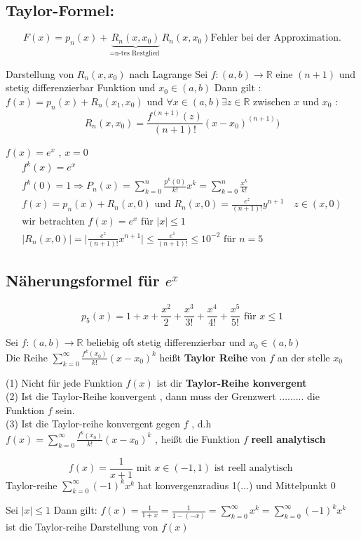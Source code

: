 \subsection{Taylor-Formel:}
\[ F(x) = p_n(x)+ \underbrace{R_n(x,x_0)}_{=  \text{n-tes Restglied }} R_n(x,x_0) \text{Fehler bei der Approximation.} \]
\begin{theorem}
Darstellung von $R_n(x,x_0)$ nach Lagrange 
Sei $f:(a,b) \rightarrow \mathbb{R}$ eine $(n+1)$ und stetig differenzierbar Funktion und $x_0 \in (a,b)$
Dann gilt : $f(x)= p_n(x)+ R_n(x_1 , x_0)$ und $\forall x \in (a,b) \exists z \in \mathbb{R}$ zwischen $x$ und $x_0$ : \\
   \[ R_n(x , x_0) = \frac{f^{(n+1)}(z)}{(n+1)!}(x-x_0)^{(n+1)}) \]
\end{theorem}
\begin{example}
$f(x)=e^x$ , $x = 0$
\begin{gather*}
f^k(x)= e^x\\
f^k(0)= 1 \Rightarrow P_n(x) = \sum_{k=0}^{n}{\frac{p^k(0)}{k!}x^k} = \sum_{k=0}^{n}{\frac{x^k}{k!}}\\
f(x)= p_n(x) + R_n(x,0) \text{ und } R_n(x,0) = \frac{e^z}{(n+1)!} y^{n+1} \quad z \in (x,0)\\
\text{wir betrachten } f(x) = e^x \text{ für } |x| \leq 1\\
\big|R_n(x,0)|=|\frac{e^z}{(n+1)!}x^{n+1}| \leq \frac{e^1}{(n+1)!} \leq 10^{-2} \text{ für } n = 5
\end{gather*}
\subsection{Näherungsformel für $e^x$}
\[ p_5 (x) = 1 + x + \frac{x^2}{2} + \frac{x^3}{3!} + \frac{x^4}{4!} + \frac{x^5}{5!} \text{ für } x \leq 1 \]
\end{example}
\begin{definition}
Sei $f : (a,b) \rightarrow \mathbb{R}$ beliebig oft stetig differenzierbar und $x_0 \in (a,b)$\\
Die Reihe $\sum_{k=0}^{\infty}{\frac{f^k(x_0)}{k!}(x-x_0)^k}$ heißt \textbf{Taylor Reihe} von $f$ an der stelle $x_0$ 
\end{definition}
\begin{remark}
(1) Nicht für jede Funktion $f(x)$ ist dir \textbf{Taylor-Reihe konvergent}\\
(2) Ist die Taylor-Reihe konvergent , dann muss der Grenzwert ......... die Funktion $f$ sein.\\
(3) Ist die Taylor-reihe konvergent gegen $f$ , d.h $f(x)= \sum_{k=0}^{\infty}{\frac{f^k(x_0)}{k!}(x - x_0)^k}$ , heißt die Funktion $f$ \textbf{reell analytisch} \\
\end{remark}
\begin{example}
\[ f(x) = \frac{1}{x+1} \text{ mit } x \in (-1 , 1) \text{ ist reell analytisch }  \]
Taylor-reihe $\sum_{k=0}^{\infty}{(-1)^kx^k}$ hat konvergenzradius 1(...) und Mittelpunkt 0 
\end{example}
\begin{theorem}
Sei $|x| \leq 1 $ Dann gilt: $f(x) = \frac{1}{1 + x} =\frac{1}{1-(-x)} = \sum_{k=0}^{\infty}{x^k} = \sum_{k=0}^{\infty}{(-1)^kx^k}$ ist die Taylor-reihe Darstellung von $f(x)$ 
\end{theorem}
